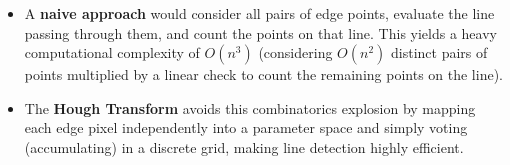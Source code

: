 {\begin{itemize}
    \item A \textbf{naive approach} would consider all pairs of edge points, evaluate the line passing through them, and count the points on that line. This yields a heavy computational complexity of $O(n^3)$ (considering $O(n^2)$ distinct pairs of points multiplied by a linear check to count the remaining points on the line).
    \item The \textbf{Hough Transform} avoids this combinatorics explosion by mapping each edge pixel independently into a parameter space and simply voting (accumulating) in a discrete grid, making line detection highly efficient.
\end{itemize}}